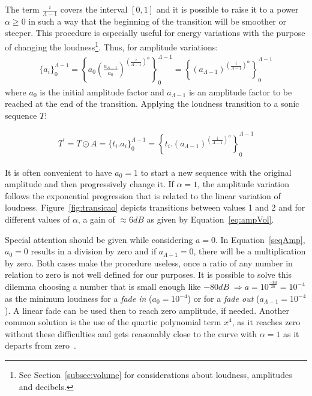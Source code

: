 The term $\frac{i}{\Lambda-1}$ covers the interval $[0,1]$ and it is possible to raise it to a power $\alpha\geq0$ in such a way that the beginning of the transition will be smoother or steeper.
This procedure is especially useful for energy variations with the purpose of changing the loudness\footnote{See Section~\ref{subsec:volume} for considerations about loudness, amplitudes and decibels.}.
Thus, for amplitude variations:
\begin{equation}\label{seqAmp}
\begin{split}
 \{a_i\}_0^{\Lambda-1}= \left \{ a_0 \left ( \frac{a_{\Lambda-1}}{a_0} \right )^{\left ( \frac{i}{\Lambda-1} \right )^\alpha} \right \}_0^{\Lambda-1}= \left \{ \left ( {a_{\Lambda-1}} \right )^{\left ( \frac{i}{\Lambda-1} \right )^\alpha} \right \}_0^{\Lambda-1}
\end{split}
\end{equation}
where $a_0$ is the initial amplitude factor and
$a_{\Lambda-1}$ is an amplitude factor to be reached at the end of the transition.
Applying the loudness transition to a sonic sequence $T$:

\begin{equation}\label{transAmp}
\begin{split}
 T^{'}=T \odot A = \{t_i . a_i\}_0^{\Lambda-1} = \left \{ t_i . (a_{\Lambda-1} )^{\left ( \frac{i}{\Lambda-1} \right )^\alpha} \right \}_0^{\Lambda-1}
\end{split}
\end{equation}

It is often convenient to have $a_0=1$ to start a new sequence with the original amplitude and then progressively change it.
If $\alpha=1$, the amplitude variation follows the exponential progression that is related to the linear variation of loudness. Figure~\ref{fig:transicao} depicts transitions between values 1 and 2 and for different values of $\alpha$, a gain of $\approx 6dB$ as given by Equation~\ref{eq:ampVol}.

Special attention should be given while considering $a=0$.
In Equation~\ref{seqAmp}, $a_0=0$ results in a division by zero and if $a_{\Lambda-1}=0$, there will be a multiplication by zero.
Both cases make the procedure useless, once a ratio of any number in relation to zero is not well defined for our purposes. It is possible to solve this dilemma choosing a number that is small enough like $-80dB\;\Rightarrow a=10^{\frac{-80}{20}}=10^{-4}$ as the minimum loudness for a \emph{fade in} ($a_0=10^{-4}$) or for a \emph{fade out} ($a_{\Lambda-1}=10^{-4}$). A linear fade can be used then to reach zero amplitude, if needed. Another common solution is the use of the quartic polynomial term $x^4$, as it reaches zero without these difficulties and gets reasonably close to the curve with $\alpha=1$ as it departs from zero~\cite{Cook}.

